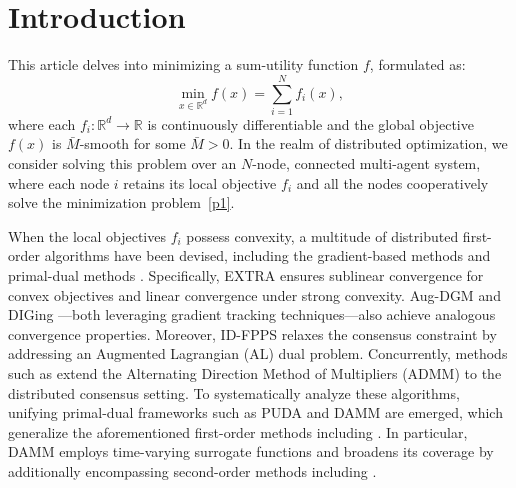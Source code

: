 \documentclass[12pt,draftcls,onecolumn]{IEEEtran}
\begin{document}
\section{Introduction}
\label{section: introduction}

This article delves into minimizing a sum-utility function $f$, formulated as:
\begin{equation}
\min _{x \in \mathbb{R}^{d}} f(x)= \sum_{i=1}^{N} f_{i}(x), \label{p1}
\end{equation}
where each $f_i:\mathbb{R}^d \rightarrow \mathbb{R}$ is continuously differentiable and the global objective $f(x)$ is $\bar{M}$-smooth for some $\bar{M}>0$. In the realm of distributed optimization, we consider solving this problem over an $N$-node, connected multi-agent system, where each node $i$ retains its local objective $f_i$ and all the nodes cooperatively solve the minimization problem~\eqref{p1}. 

When the local objectives $f_i$ possess convexity, a multitude of distributed first-order algorithms have been devised, including the gradient-based methods \cite{shi_extra_2015,AugDGM2015,nedic_achieving_2017} and primal-dual methods \cite{xu_bregman_2018,ADMMconvex2014,ADMMconvex2017}. Specifically, EXTRA \cite{shi_extra_2015} ensures sublinear convergence for convex objectives and linear convergence under strong convexity. Aug-DGM \cite{AugDGM2015} and DIGing \cite{nedic_achieving_2017}—both leveraging gradient tracking techniques—also achieve analogous convergence properties. Moreover, ID-FPPS \cite{xu_bregman_2018} relaxes the consensus constraint by addressing an Augmented Lagrangian (AL) dual problem. Concurrently, methods such as \cite{ADMMconvex2014,ADMMconvex2017} extend the Alternating Direction Method of Multipliers (ADMM) to the distributed consensus setting. To systematically analyze these algorithms, unifying primal-dual frameworks such as PUDA \cite{alghunaim_decentralized_2021} and DAMM \cite{Wu2020AUA} are emerged, which generalize the aforementioned first-order methods including \cite{shi_extra_2015,AugDGM2015,nedic_achieving_2017,xu_bregman_2018}. In particular, DAMM employs time-varying surrogate functions and broadens its coverage by additionally encompassing second-order methods including \cite{mokhtari_dqm_2016,wu_second-order_2021}. 
\end{document}
